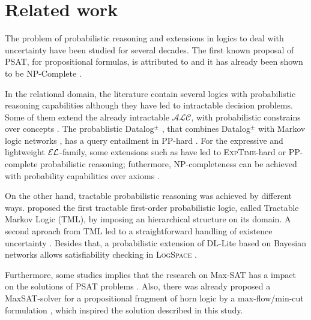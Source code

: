 
\chapter{Related work}
\label{cap:relatedwork}

The problem of probabilistic reasoning and extensions in logics to deal with uncertainty have been studied for several decades. The first known proposal of PSAT, for propositional formulas, is attributed to \citet{boole1854investigation} and it has already been shown to be NP-Complete \citep{georgakopoulos1988probabilistic}.

In the relational domain, the literature contain several logics with probabilistic reasoning capabilities although they have led to intractable decision problems.  Some of them extend the already intractable $\mathcal{ALC}$, with probabilistic constrains over concepts \citep{heinsohn1994probabilistic, lukasiewicz2008expressive, GutierrezBasultoEA11}. The probablistic Datalog$^\pm$ \citep{gottlob2013query}, that combines Datalog$^\pm$ with Markov logic networks \citep{richardson2006markov}, has a query entailment in PP-hard \citep{ceylan_datalog_compl_2016}. For the expressive and lightweight $\mathcal{EL}$-family, some extensions such as \citet{gutierrez2017probabilistic,ceylan2017bayesian} have led to \textsc{ExpTime}-hard or PP-complete probabilistic reasoning; futhermore, NP-completeness can be achieved with probability capabilities over axioms \citep{Fin2019b}.

On the other hand, tractable probabilistic reasoning was achieved by different ways. \citet{Domingos_Webb_2012} proposed the first tractable first-order probabilistic logic, called Tractable Markov Logic (TML), by imposing an hierarchical structure on its domain. A second aproach from TML led to a straightforward handling of existence uncertainty \citep{webb2013tractable}. Besides that, a probabilistic extension of DL-Lite based on Bayesian networks allows satisfiability checking in \textsc{LogSpace} \citep{damato_prob_dl_lite_2008}. 

Furthermore, some studies implies that the research on Max-SAT has a impact on the solutions of PSAT problems \citep{andersen2001easy}. Also, there was already proposed a MaxSAT-solver for a propositional fragment of horn logic by a max-flow/min-cut formulation \citep{jaumard1987complexity}, which inspired the solution described in this study.